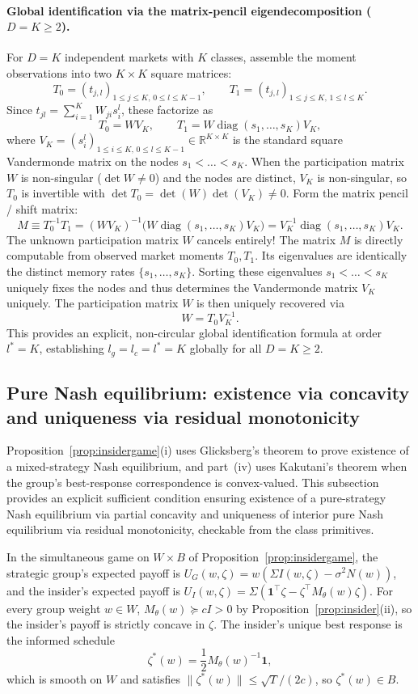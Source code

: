 \documentclass[12pt]{article}
\theoremstyle{definition}
\theoremstyle{remark}
\begin{document}
\paragraph{Global identification via the matrix-pencil eigendecomposition ($D=K\ge2$).} For $D=K$ independent markets with $K$ classes, assemble the moment observations into two $K\times K$ square matrices:
\[
T_0 = (t_{j,l})_{1\le j\le K,\,0\le l\le K-1},\qquad T_1 = (t_{j,l})_{1\le j\le K,\,1\le l\le K}.
\]
Since $t_{jl}=\sum_{i=1}^K W_{ji}s_i^l$, these factorize as
\[
T_0 = W V_K,\qquad T_1 = W \operatorname{diag}(s_1,\dots,s_K) V_K,
\]
where $V_K=(s_i^l)_{1\le i\le K,\,0\le l\le K-1}\in\mathbb{R}^{K\times K}$ is the standard square Vandermonde matrix on the nodes $s_1<\dots<s_K$. When the participation matrix $W$ is non-singular ($\det W\ne0$) and the nodes are distinct, $V_K$ is non-singular, so $T_0$ is invertible with $\det T_0 = \det(W)\det(V_K)\ne0$. Form the matrix pencil / shift matrix:
\[
M \equiv T_0^{-1}T_1 = (W V_K)^{-1}\bigl(W \operatorname{diag}(s_1,\dots,s_K) V_K\bigr) = V_K^{-1}\operatorname{diag}(s_1,\dots,s_K) V_K.
\]
The unknown participation matrix $W$ cancels entirely! The matrix $M$ is directly computable from observed market moments $T_0, T_1$. Its eigenvalues are identically the distinct memory rates $\{s_1,\dots,s_K\}$. Sorting these eigenvalues $s_1<\dots<s_K$ uniquely fixes the nodes and thus determines the Vandermonde matrix $V_K$ uniquely. The participation matrix $W$ is then uniquely recovered via
\[
W = T_0 V_K^{-1}.
\]
This provides an explicit, non-circular global identification formula at order $l^*=K$, establishing $l_g=l_c=l^*=K$ globally for all $D=K\ge2$.

\subsection{Pure Nash equilibrium: existence via concavity and uniqueness via residual monotonicity}\label{app:nashtight}

Proposition~\ref{prop:insidergame}(i) uses Glicksberg's theorem to prove existence of a mixed-strategy Nash equilibrium, and part~(iv) uses Kakutani's theorem when the group's best-response correspondence is convex-valued. This subsection provides an explicit sufficient condition ensuring existence of a pure-strategy Nash equilibrium via partial concavity and uniqueness of interior pure Nash equilibrium via residual monotonicity, checkable from the class primitives.

In the simultaneous game on $W\times B$ of Proposition~\ref{prop:insidergame}, the strategic group's expected payoff is $U_G(w,\zeta)=w(\Sigma I(w,\zeta)-\sigma^2 N(w))$, and the insider's expected payoff is $U_I(w,\zeta)=\Sigma(\mathbf 1^\top\zeta-\zeta^\top M_\theta(w)\zeta)$. For every group weight $w\in W$, $M_\theta(w)\succeq c I>0$ by Proposition~\ref{prop:insider}(ii), so the insider's payoff is strictly concave in $\zeta$. The insider's unique best response is the informed schedule
\[
\zeta^*(w) = \frac12 M_\theta(w)^{-1}\mathbf 1,
\]
which is smooth on $W$ and satisfies $\|\zeta^*(w)\|\le\sqrt T/(2c)$, so $\zeta^*(w)\in B$.
\end{document}
